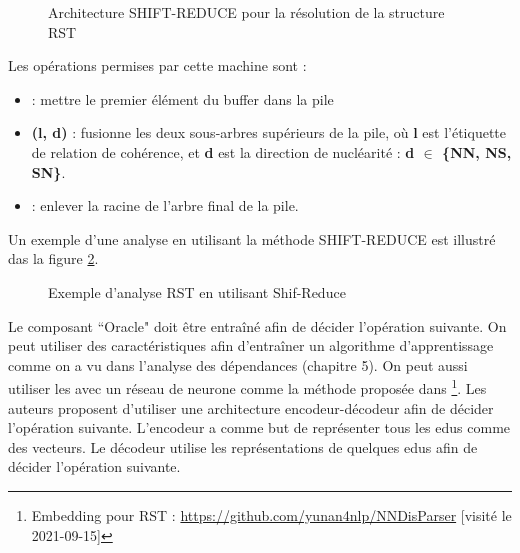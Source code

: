 \documentclass{KodeBook}
\begin{document}
\begin{figure}[!ht]
	\centering
	\caption{Architecture SHIFT-REDUCE pour la résolution de la structure RST}
	\label{fig:rst-shift-reduce}
\end{figure}

Les opérations permises par cette machine sont :
\begin{itemize}
	\item {} : mettre le premier élément du buffer dans la pile
	\item {}\textbf{(l, d)} : fusionne les deux sous-arbres supérieurs de la pile, où \textbf{l} est l'étiquette de relation de cohérence, et \textbf{d} est la direction de nucléarité : \textbf{d $ \in $ \{NN, NS, SN\}}.
	\item {} : enlever la racine de l'arbre final de la pile.
\end{itemize}
Un exemple d'une analyse  en utilisant la méthode SHIFT-REDUCE est illustré das la figure \ref{fig:rst-shred-yu-al}.

\begin{figure}[!ht]
	\centering
	
	\caption[Exemple d'analyse RST en utilisant Shif-Reduce]{Exemple d'analyse RST en utilisant Shif-Reduce \cite{2018-yu-al}}
	\label{fig:rst-shred-yu-al}
\end{figure}

Le composant ``Oracle" doit être entraîné afin de décider l'opération suivante. 
On peut utiliser des caractéristiques afin d'entraîner un algorithme d'apprentissage comme on a vu dans l'analyse des dépendances (chapitre 5). 
On peut aussi utiliser les  avec un réseau de neurone comme la méthode proposée dans \cite{2018-yu-al}\footnote{Embedding pour RST : \url{https://github.com/yunan4nlp/NNDisParser} [visité le 2021-09-15]}. 
Les auteurs proposent d'utiliser une architecture encodeur-décodeur afin de décider l'opération suivante. 
L'encodeur a comme but de représenter tous les \acp{edu} comme des vecteurs.
Le décodeur utilise les représentations de quelques \acp{edu} afin de décider l'opération suivante. 
\end{document}
